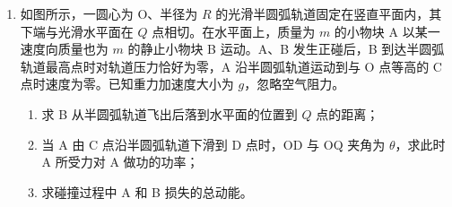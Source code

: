 \documentclass[\gkver]{gaokaozhenti}
\begin{document}
\begin{enumerate}
{\begin{enumerate}
	$p_{3}=p_{0}$

	由理想气体状态方程得

	$\frac{p_{1}V_{1}}{T_{1}}=\frac{p_{3}V_{3}}{T_{3}}$

	解得

	$T_{3}=\frac{p_{0}SV_{3}T_{1}}{(p_{0}S+mg)V_{1}}$
\end{enumerate}
}

\item
如图所示，一圆心为 O、半径为 $R$ 的光滑半圆弧轨道固定在竖直平面内，其下端与光滑水平面在 $Q$ 点相切。在水平面上，质量为 $m$ 的小物块 A 以某一速度向质量也为 $m$ 的静止小物块 B 运动。A、B 发生正碰后，B 到达半圆弧轨道最高点时对轨道压力恰好为零，A 沿半圆弧轨道运动到与 O 点等高的 C 点时速度为零。已知重力加速度大小为 $g$，忽略空气阻力。

\begin{enumerate}
	\item
	求 B 从半圆弧轨道飞出后落到水平面的位置到 $Q$ 点的距离；

	\item
	当 A 由 C 点沿半圆弧轨道下滑到 D 点时，OD 与 OQ 夹角为 $\theta$，求此时 A 所受力对 A 做功的功率；

	\item
	求碰撞过程中 A 和 B 损失的总动能。
\end{enumerate}


\end{enumerate}
\end{document}
